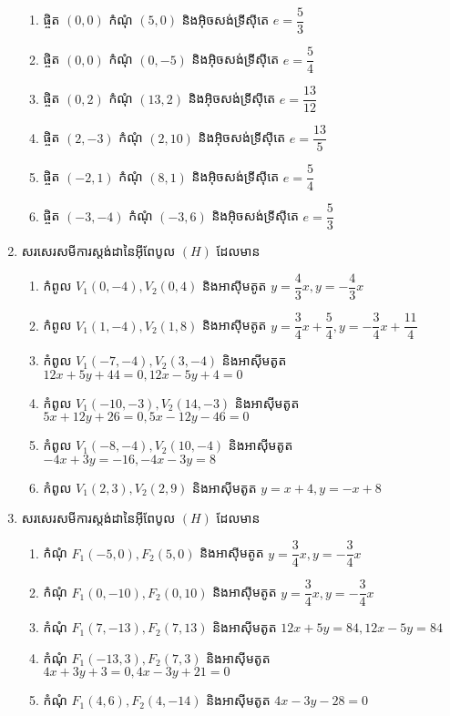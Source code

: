 \begin{enumerate}
\begin{enumerate}
		\item ផ្ចិត $ (0,0) $ កំណុំ $ (5,0) $ និងអ៊ិចសង់ទ្រីស៊ីតេ $ e=\dfrac{5}{3} $
		\item ផ្ចិត $ (0,0) $ កំណុំ $ (0,-5) $ និងអ៊ិចសង់ទ្រីស៊ីតេ $ e=\dfrac{5}{4} $
		\item ផ្ចិត $ (0,2) $ កំណុំ $ (13,2) $ និងអ៊ិចសង់ទ្រីស៊ីតេ $ e=\dfrac{13}{12} $
		\item ផ្ចិត $ (2,-3) $ កំណុំ $ (2,10) $ និងអ៊ិចសង់ទ្រីស៊ីតេ $ e=\dfrac{13}{5} $
		\item ផ្ចិត $ (-2,1) $ កំណុំ $ (8,1) $ និងអ៊ិចសង់ទ្រីស៊ីតេ $ e=\dfrac{5}{4} $
		\item ផ្ចិត $ (-3,-4) $ កំណុំ $ (-3,6) $ និងអ៊ិចសង់ទ្រីស៊ីតេ $ e=\dfrac{5}{3} $
	\end{enumerate}
	\item សរសេរសមីការស្តង់ដានៃអ៊ីពែបូល $ (H) $ ដែលមាន
	\begin{enumerate}
		\item កំពូល $ V_1(0,-4),V_2(0,4) $ និងអាស៊ីមតូត $ y=\dfrac{4}{3}x,y=-\dfrac{4}{3}x $
		\item កំពូល $ V_1(1,-4),V_2(1,8) $ និងអាស៊ីមតូត $ y=\dfrac{3}{4}x+\dfrac{5}{4},y=-\dfrac{3}{4}x+\dfrac{11}{4} $
		\item កំពូល $ V_1(-7,-4),V_2(3,-4) $ និងអាស៊ីមតូត\\ $ 12x+5y+44=0,12x-5y+4=0 $
		\item កំពូល $ V_1(-10,-3),V_2(14,-3) $ និងអាស៊ីមតូត\\ $ 5x+12y+26=0,5x-12y-46=0 $
		\item កំពូល $ V_1(-8,-4),V_2(10,-4) $ និងអាស៊ីមតូត\\ $ -4x+3y=-16,-4x-3y=8 $
		\item កំពូល $ V_1(2,3),V_2(2,9) $ និងអាស៊ីមតូត $ y=x+4,y=-x+8 $
	\end{enumerate}
	\item សរសេរសមីការស្តង់ដានៃអ៊ីពែបូល $ (H) $ ដែលមាន
	\begin{enumerate}
		\item កំណុំ $ F_1(-5,0),F_2(5,0) $ និងអាស៊ីមតូត $ y=\dfrac{3}{4}x,y=-\dfrac{3}{4}x $
		\item កំណុំ $ F_1(0,-10),F_2(0,10) $ និងអាស៊ីមតូត $ y=\dfrac{3}{4}x,y=-\dfrac{3}{4}x $
		\item កំណុំ $ F_1(7,-13),F_2(7,13) $ និងអាស៊ីមតូត $ 12x+5y=84,12x-5y=84 $
		\item កំណុំ $ F_1(-13,3),F_2(7,3) $ និងអាស៊ីមតូត $ 4x+3y+3=0, 4x-3y+21=0 $
		\item កំណុំ $ F_1(4,6),F_2(4,-14) $ និងអាស៊ីមតូត $ 4x-3y-28=0 $%

\end{enumerate}
\end{enumerate}
